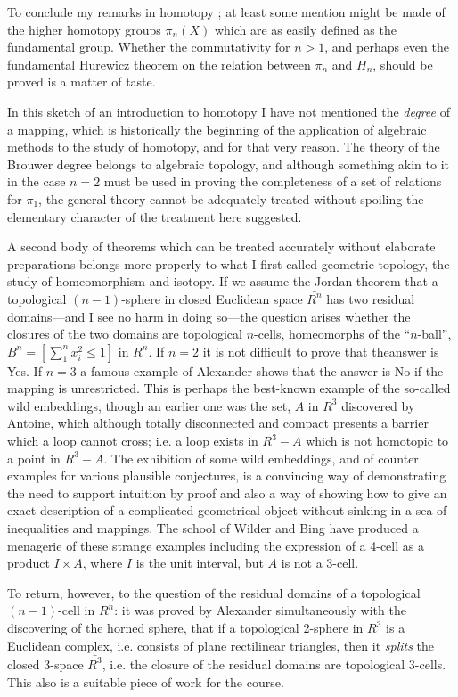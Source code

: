 To conclude my remarks in homotopy ; at least some mention might be
made of the higher homotopy groups $\pi_n (X)$ which are as easily
defined as the fundamental group. Whether the commutativity for $n
>1$, and perhaps even the fundamental Hurewicz theorem on the relation
between $\pi_n$ and $H_n$, should be proved is a matter of taste.

In this sketch of an introduction to homotopy I have not mentioned the
\textit{degree} of a mapping, which is historically the beginning of
the application of algebraic methods to the study of homotopy, and for
that very reason. The theory of the Brouwer degree belongs to
algebraic topology, and although something akin to it in the case
$n=2$ must be used in proving the completeness of a set of relations
for $\pi_1$, the general theory cannot be adequately treated without
spoiling the elementary character of the treatment here suggested. 

A second body of theorems which can be treated accurately without
elaborate preparations belongs more properly to what I first called
geometric topology, the study of homeomorphism and isotopy. If we
assume the Jordan theorem that a topological $(n-1)$-sphere in closed
Euclidean space $\bar{R^n}$ has two residual domains---and I see no
harm in doing so---the question arises whether the closures of the two
domains are topological $n$-cells, homeomorphs of the ``$n$-ball'',
$B^n = \left[\sum\limits^n_1 x^2_i \leqslant 1 \right]$ in $R^n$. If
$n =2$ it is not difficult to prove that the\pageoriginale answer is
Yes. If $n=3$ a famous example of Alexander shows that the answer is
No if the mapping is unrestricted. This is perhaps the best-known
example of the so-called wild embeddings, though an earlier one was
the set, $A$ in $R^3$ discovered by Antoine, which although totally
disconnected and compact presents a barrier which a loop cannot cross;
i.e. a loop exists in $R^3 -A$ which is not homotopic to a point in
$R^3 -A$. The exhibition of some wild embeddings, and of counter
examples for various plausible conjectures, is a convincing way of
demonstrating the need to support intuition by proof and also a way of
showing how to give an exact description  of a complicated geometrical
object without sinking in a sea of inequalities and mappings. The
school of Wilder and Bing have produced a menagerie of these strange
examples including the expression of a 4-cell as a product $I \times
A$, where $I$ is the unit interval, but $A$ is not a 3-cell.

To return, however, to the question of the residual domains of a
topological $(n-1)$-cell in $R^n$: it was proved by Alexander
simultaneously with the discovering of the horned sphere, that if a
topological 2-sphere in $R^3$ is a Euclidean complex, i.e. consists of
plane rectilinear triangles, then it \textit{splits} the closed
3-space $\bar{R^3}$, i.e. the closure of the residual domains are
topological 3-cells. This also is a suitable piece of work for the course.

